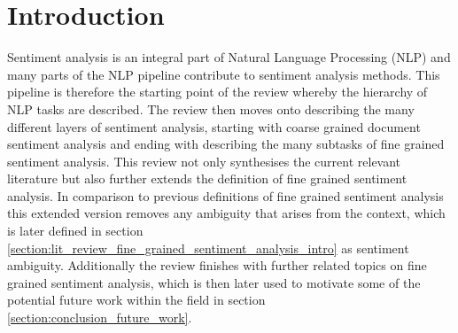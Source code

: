 \section{Introduction}
Sentiment analysis is an integral part of Natural Language Processing (NLP) and many parts of the NLP pipeline contribute to sentiment analysis methods. This pipeline is therefore the starting point of the review whereby the hierarchy of NLP tasks are described. The review then moves onto describing the many different layers of sentiment analysis, starting with coarse grained document sentiment analysis and ending with describing the many subtasks of fine grained sentiment analysis. This review not only synthesises the current relevant literature but also further extends the definition of fine grained sentiment analysis. In comparison to previous definitions of fine grained sentiment analysis this extended version removes any ambiguity that arises from the context, which is later defined in section \ref{section:lit_review_fine_grained_sentiment_analysis_intro} as sentiment ambiguity. Additionally the review finishes with further related topics on fine grained sentiment analysis, which is then later used to motivate some of the potential future work within the field in section \ref{section:conclusion_future_work}.

